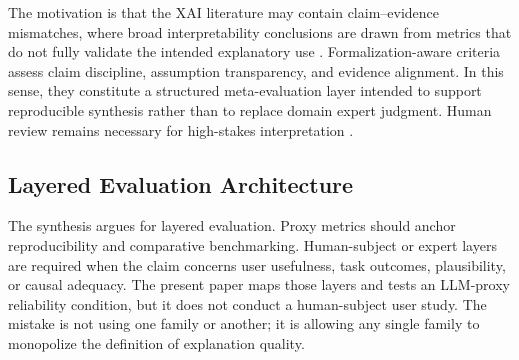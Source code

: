\documentclass[10pt]{article}
\begin{document}
The motivation is that the XAI literature may contain claim--evidence
mismatches, where broad interpretability conclusions are drawn from metrics
that do not fully validate the intended explanatory use
\citep{haufe2026formalization,hedstrom2023quantus}. Formalization-aware
criteria assess claim discipline, assumption transparency, and evidence
alignment. In this sense, they constitute a structured meta-evaluation
layer intended to support reproducible synthesis rather than to replace
domain expert judgment. Human review remains necessary for high-stakes
interpretation \citep{bucinca2020proxy,bansal2021whole,fok2023verifiability}.

\subsection{Layered Evaluation Architecture}

The synthesis argues for layered evaluation. Proxy metrics should anchor
reproducibility and comparative benchmarking. Human-subject or expert
layers are required when the claim concerns user usefulness, task
outcomes, plausibility, or causal adequacy. The present paper maps those
layers and tests an LLM-proxy reliability condition, but it does not
conduct a human-subject user study. The mistake is not using one family
or another; it is allowing any single family to monopolize the definition
of explanation quality.
\end{document}
